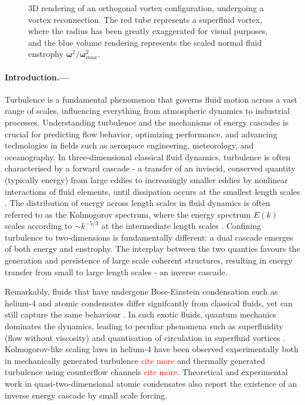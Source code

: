 \documentclass[%
 reprint,
 amsmath,amssymb,
 aps,
 prl,
]{revtex4-2}
\newcommand{\bom}{\boldsymbol{\omega}}
\def\red#1{\textcolor{red}{#1}}
\begin{document}
\begin{figure}
\begin{subfigure}[b]{0.24\textwidth}
	\end{subfigure}
    \hfill
	\caption{3D rendering of an orthogonal vortex configuration, undergoing a vortex reconnection. The red tube represents a superfluid vortex, where the radius has been greatly exaggerated for visual purposes, and the blue volume rendering represents the scaled normal fluid enstrophy $\bom^2/\bom^2_{max}$.}
    \label{fig:visualisation}
\end{figure}

\paragraph*{Introduction.---}

Turbulence is a fundamental phenomenon that governs fluid motion across a vast range of scales, influencing everything from atmospheric dynamics to industrial processes. Understanding turbulence and the mechanisms of energy cascades is crucial for predicting flow behavior, optimizing performance, and advancing technologies in fields such as aerospace engineering, meteorology, and oceanography. In three-dimensional classical fluid dynamics, turbulence is often characterised by a forward cascade - a transfer of an inviscid, conserved quantity (typically energy) from large eddies to increasingly smaller eddies by nonlinear interactions of fluid elements, until dissipation occurs at the smallest length scales \cite{richardson1922weather}. The distribution of energy across length scales in fluid dynamics is often referred to as the Kolmogorov spectrum, where the energy spectrum $E(k)$ scales according to $\sim k^{-5/3}$ at the intermediate length scales \cite{frisch1995}.  
Confining turbulence to two-dimensions is fundamentally different: a dual cascade emerges of both energy and enstrophy. The interplay between the two quanties favours the generation and persistence of large scale coherent structures, resulting in energy transfer from small to large length scales - an inverse cascade. 

Remarkably, fluids that have undergone Bose-Einstein condensation such as helium-4 and atomic condensates differ signifcantly from classical fluids, yet can still capture the same behaviour \cite{maurer1998,baggaley2012,sherwin-robson2015}. In such exotic fluids, quantum mechanics dominates the dynamics, leading to peculiar phenomena such as superfluidity (flow without viscosity) and quantisation of circulation in superfluid vortices \cite{barenghi2009vortices}. Kolmogorov-like scaling laws in helium-4 have been observed experimentally both in mechanically generated turbulence \cite{salort2010turbulent} \red{cite more} and thermally generated turbulence using counterflow channels \cite{gao2017energy} \red{cite more}. Theoretical \cite{bradley2012energy,reeves2013,simula2014emergence} and experimental \cite{johnstone2019evolution,gauthier2019giant} work in quasi-two-dimensional atomic condensates also report the existence of an inverse energy cascade by small scale forcing.
\end{document}

